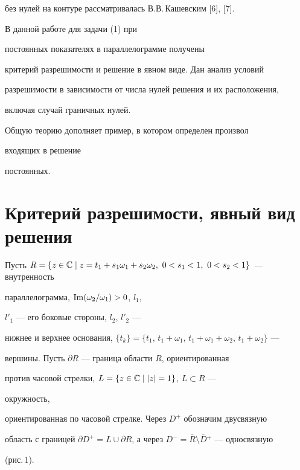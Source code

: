 без нулей на контуре рассматривалась В.В.\,Кашевским [6], [7].





В данной работе для задачи (1) при


постоянных показателях в параллелограмме получены


критерий разрешимости и решение в явном виде. Дан анализ условий


разрешимости в зависимости от числа нулей решения и их расположения,


включая случай граничных нулей.


Общую теорию дополняет пример, в котором определен произвол


входящих в решение


постоянных.





\section{Критерий разрешимости, явный вид решения}





Пусть $R= \{ z\in \Bbb C \mid z=t_1+s_1 \omega _1 + s_2


\omega _2,\ 0<s_1 <1,\ 0<s_2 <1 \}$ --- внутренность


параллелограмма, $\operatorname{Im} (\omega_2/ \omega_1 )>0$, $l_1$,


$l'_1$ --- его боковые стороны, $l_2$, $l'_2$ ---


нижнее и верхнее основания, $\{t_k\} =\{t_1,\,t_1 +


\omega_1,\,t_1+ \omega_1 + \omega_2,\,t_1+ \omega _2\}$ ---


вершины. Пусть $\partial R$ --- граница области $R$, ориентированная


против часовой стрелки, $L=\{z\in\Bbb C \mid |z|=1 \}$, $L\subset R$ ---


окружность,


ориентированная по часовой стрелке. Через $D^+$ обозначим двусвязную


область с границей $ \partial D^+ =L \cup \partial R $, а через $D^- =


\overline {R} \setminus \overline {D}{}^+$ --- односвязную


(рис.\,1).





